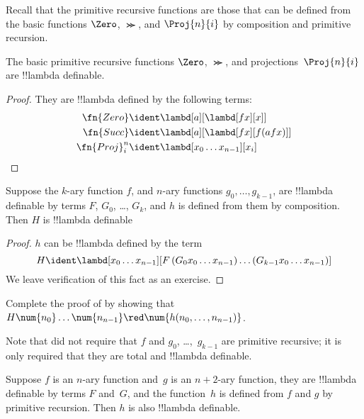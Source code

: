 \documentclass[../../../include/open-logic-section]{subfiles}
\begin{document}

Recall that the primitive recursive functions are those that can be
defined from the basic functions $\Zero$, $\Succ$, and $\Proj{n}{i}$
by composition and primitive recursion.

\begin{lem}
  The basic primitive recursive functions $\Zero$, $\Succ$, and
  projections~$\Proj{n}{i}$ are !!{lambda definable}.
\end{lem}

\begin{proof}
They are !!{lambda define}d by the following terms:
\begin{align*}
  \fn{Zero} & \ident \lambd[a][\lambd[fx][x]]\\
  \fn{Succ} & \ident \lambd[a][\lambd[fx][f (a f x)]] \\
  \fn{Proj}^n_i & \ident \lambd[x_0\dots x_{n-1}][x_i] \qedhere
\end{align*}
\end{proof}

\begin{lem}
   Suppose the $k$-ary function $f$, and $n$-ary
  functions $g_0, \dots, g_{k-1}$, are !!{lambda definable} by terms
  $F$, $G_0$, \dots, $G_k$, and $h$ is defined from them by composition.
  Then $H$ is !!{lambda definable}
\end{lem}

\begin{proof}
  $h$ can be !!{lambda define}d by the term
  \[
  H \ident \lambd[x_0 \dots x_{n-1}][F\, (G_0 x_0 \dots
    x_{n-1}) \dots (G_{k-1} x_0 \dots x_{n-1})]
  \]
  We leave verification of this fact as an exercise.
\end{proof}

\begin{prob}
  Complete the proof of  by showing
  that $H\num{n_0}\dots\num{n_{n-1}} \red \num{h(n_0, \dots,
    n_{n-1})}$.
\end{prob}

Note that  did not require that $f$ and $g_0$,
\dots,~$g_{k-1}$ are primitive recursive; it is only required that
they are total and !!{lambda definable}.

\begin{lem}
  Suppose $f$ is an $n$-ary function and~$g$ is an $n+2$-ary function,
  they are !!{lambda definable} by terms $F$ and~$G$, and the
  function~$h$ is defined from $f$ and $g$ by primitive
  recursion. Then $h$ is also !!{lambda definable}.
\end{lem}
\end{document}
